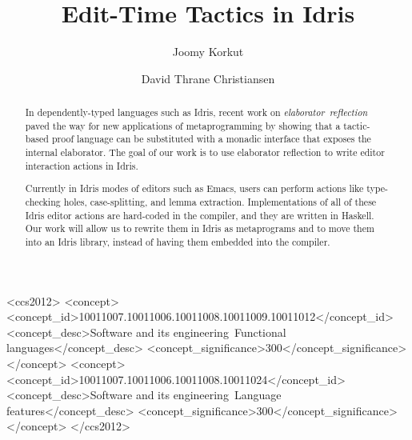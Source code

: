 \documentclass[sigplan, authordraft]{acmart}
\begin{document}
\title[Edit-Time Tactics in Idris]{Edit-Time Tactics in Idris}

\author{Joomy Korkut}

\author{David Thrane Christiansen}


\renewcommand{\shortauthors}{Joomy Korkut and David Thrane Christiansen}

\begin{abstract}
  In dependently-typed languages such as Idris, recent work on
  \mbox{\emph{elaborator reflection}~\cite{elabref}} paved the way for new
  applications of metaprogramming by showing that a tactic-based proof language
  can be substituted with a monadic interface that exposes the internal
  elaborator. The goal of our work is to use elaborator reflection to write
  editor interaction actions in Idris.

  Currently in Idris modes of editors such as Emacs, users can perform actions
  like type-checking holes, case-splitting, and lemma extraction.
  Implementations of all of these Idris editor actions are hard-coded in the
  compiler, and they are written in Haskell. Our work will allow us to rewrite
  them in Idris as metaprograms and to move them into an Idris library,
  instead of having them embedded into the compiler.
\end{abstract}

%
%
 \begin{CCSXML}
<ccs2012>
<concept>
<concept_id>10011007.10011006.10011008.10011009.10011012</concept_id>
<concept_desc>Software and its engineering~Functional languages</concept_desc>
<concept_significance>300</concept_significance>
</concept>
<concept>
<concept_id>10011007.10011006.10011008.10011024</concept_id>
<concept_desc>Software and its engineering~Language features</concept_desc>
<concept_significance>300</concept_significance>
</concept>
</ccs2012>
\end{CCSXML}


\end{document}
